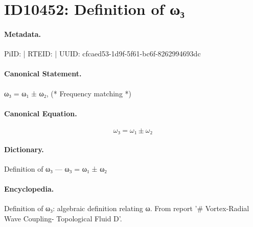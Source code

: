 \section*{ID10452: Definition of ω₃}
\paragraph{Metadata.}
PiID:  | RTEID:  | UUID: cfcaed53-1d9f-5f61-bc6f-8262994693dc

\paragraph{Canonical Statement.}
ω₃ = ω₁ ± ω₂, (* Frequency matching *)

\paragraph{Canonical Equation.}
\[
ω₃ = ω₁ ± ω₂
\]

\paragraph{Dictionary.}
Definition of ω₃ — ω₃ = ω₁ ± ω₂

\paragraph{Encyclopedia.}
Definition of ω₃: algebraic definition relating ω. From report '\# Vortex-Radial Wave Coupling- Topological Fluid D'.

